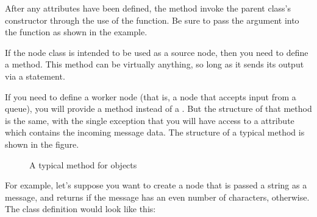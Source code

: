 \documentclass[letterpaper,10pt,english]{sphinxmanual}
\let\sphinxpxdimen\pdfpxdimen\else\newdimen\sphinxpxdimen
\begin{document}
After any attributes have been defined, the  method 
invoke the parent class’s constructor through the use of the 
function. Be sure to pass the  argument into the function as
shown in the example.

If the node class is intended to be used as a source node, then you need to
define a  method. This method can be virtually anything, so long
as it sends its output via a  statement.

If you need to define a worker node (that is, a node that accepts input
from a queue), you will provide a  method instead of a
. But the structure of that method is the same, with the single
exception that you will have access to a  attribute which
contains the incoming message data. The structure of a typical 
method is shown in the figure.

\begin{figure}[htbp]
\centering
\capstart

\noindent\sphinxincludegraphics[width=400\sphinxpxdimen]{{process_item}.png}
\caption{A typical  method for  objects}\label{\detokenize{treehorn:id4}}\end{figure}

For example, let’s suppose you want to create a node that is passed a string as a
message, and returns  if the message has an even number of
characters,  otherwise. The class definition would look like
this:

%
\begin{sphinxVerbatim}[commandchars=\\\{\}]
 
     
         

     
             
             
             
\end{sphinxVerbatim}
\end{document}
